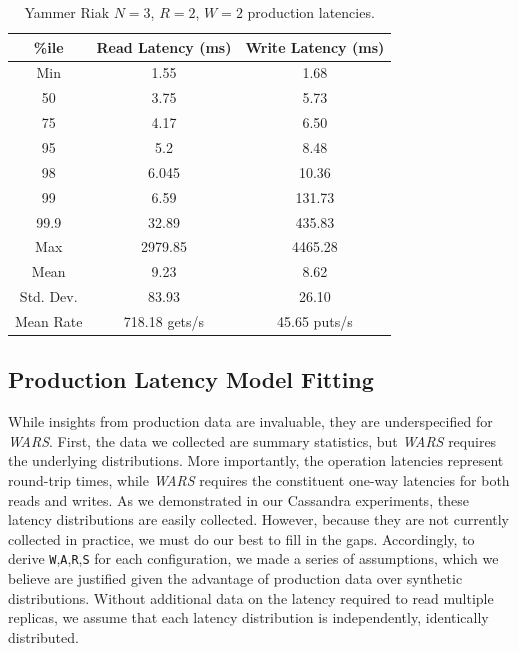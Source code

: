 \documentclass{vldb}
\newcommand{\subsectionskip}{-0em}
\begin{document}
\begin{table}
\centering
\begin{tabular}{|c|c|c|}
\hline
\%ile & Read Latency (ms) & Write Latency (ms)\\
\hline
Min & 1.55 & 1.68\\
50 & 3.75 & 5.73 \\
75 & 4.17 & 6.50\\
95 & 5.2 & 8.48\\
98 & 6.045 & 10.36 \\
99 & 6.59 & 131.73\\
99.9 & 32.89 & 435.83\\
Max & 2979.85 &  4465.28 \\
\hline
Mean & 9.23 & 8.62 \\
Std. Dev. & 83.93 & 26.10\\
\hline
Mean Rate & 718.18 gets/s & 45.65 puts/s\\
\hline
\end{tabular}
\vspace{-6pt}
\caption{Yammer Riak $N$$=$$3$, $R$$=$$2$, $W$$=$$2$ production latencies.}
\vspace{-12pt}
\label{table:yammer}
\end{table}

\vspace{\subsectionskip}\subsection{Production Latency Model Fitting}

While insights from production data are invaluable, they are
underspecified for \textit{WARS}.  First, the data we collected are
summary statistics, but \textit{WARS} requires the underlying
distributions.  More importantly, the operation latencies represent
round-trip times, while \textit{WARS} requires the constituent one-way
latencies for both reads and writes.  As we demonstrated in our
Cassandra experiments, these latency distributions are easily
collected.  However, because they are not currently collected in
practice, we must do our best to fill in the gaps. Accordingly, to
derive \texttt{W},\texttt{A},\texttt{R},\texttt{S} for each
configuration, we made a series of assumptions, which we believe are
justified given the advantage of production data over synthetic
distributions.  Without additional data on the latency required to
read multiple replicas, we assume that each latency distribution is
independently, identically distributed.
\end{document}
